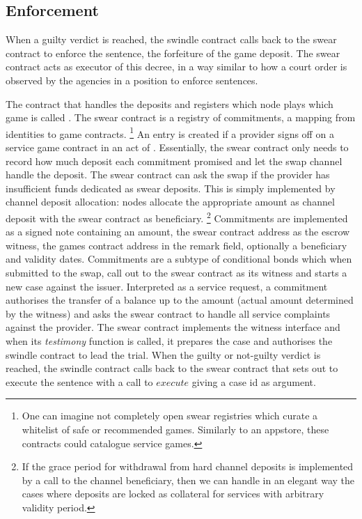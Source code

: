 \subsection{Enforcement}

When a guilty verdict is reached, the swindle contract calls back to the swear contract to enforce the sentence, the forfeiture of the game deposit. The swear contract acts as executor of this decree, in a way similar to how a court order is observed by the agencies in a position to enforce sentences.  

The contract that handles the deposits and registers which node plays which game is called .
The swear contract is a registry of commitments, a mapping from identities to game contracts.%
%
\footnote{One can imagine not completely open swear registries which curate a whitelist of safe or recommended games. Similarly to an appstore, these contracts could catalogue service games.}
%
An entry is created if a provider signs off on a service game contract in an act of . Essentially, the swear contract only needs to record how much deposit each commitment promised and let the swap channel handle the deposit.
The swear contract can  ask the swap if the provider has insufficient funds dedicated as swear deposits. This is simply implemented by channel deposit allocation: nodes allocate the appropriate amount as channel deposit with the swear contract as beneficiary.%
%
\footnote{If the grace period for withdrawal from hard channel deposits is implemented by a call to the channel beneficiary, then we can handle in an elegant way the cases where deposits are locked as collateral for services with arbitrary validity period.}
%
Commitments are implemented as a signed note containing an amount, the swear contract address as the escrow witness, the games contract address in the remark field, optionally a beneficiary and validity dates. Commitments are a subtype of conditional bonds which when submitted to the swap, call out to the swear contract as its witness and starts a new case against the issuer. 
Interpreted as a service request, a commitment authorises the transfer of a balance up to the amount (actual amount determined by the witness) and asks the swear contract to handle all service complaints against the provider. The swear contract implements the witness interface and when its \emph{testimony} function is called, it prepares the case and authorises the swindle contract to lead the trial. When the guilty or not-guilty verdict is reached, the swindle contract calls back to the swear contract that sets out to execute the sentence with a call to $execute$ giving a case id as argument.

